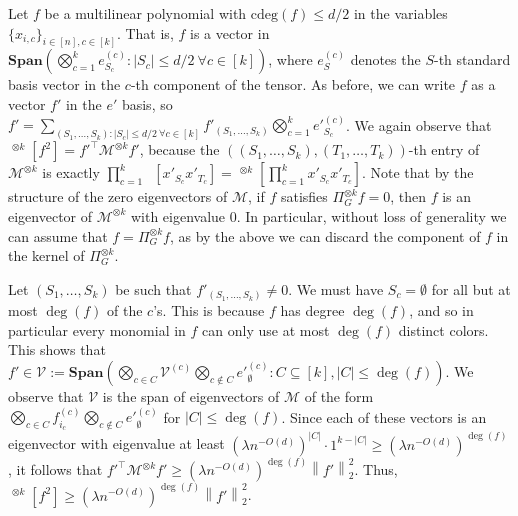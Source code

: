 \documentclass[10pt,a4paper]{article}
\theoremstyle{definition}
\newcommand{\cV}{\mathcal V}
\DeclareMathOperator{\pE}{\tilde{\mathbb{E}}}
\def\Span#1{\textbf{Span}\left(#1  \right)}
\def\abs#1{\left|#1  \right|}
\def\norm#1{\left\| #1 \right\|}
\newcommand{\M}{\mathcal{M}}
\newcommand{\cdeg}{\mathrm{cdeg}}
\newcommand{\numcolors}{k}
\begin{document}
Let $f$ be a multilinear polynomial with $\cdeg(f) \leq d/2$ in the variables $\{x_{i,c}\}_{i \in [n], c \in [\numcolors]}$. That is, $f$ is a vector in $\Span{ \bigotimes_{c =1}^{\numcolors} e^{(c)}_{S_c} : \abs{S_c} \leq d/2 \ \forall c \in [\numcolors]}$, where $e^{(c)}_S$ denotes the $S$-th standard basis vector in the $c$-th component of the tensor. As before, we can write $f$ as a vector $f'$ in the $e'$ basis, so $f' = \sum_{(S_1, \dots, S_\numcolors) : \abs{S_c} \leq d/2 \ \forall c \in [\numcolors]} f'_{(S_1, \dots, S_\numcolors)} \bigotimes_{c = 1}^\numcolors e'^{(c)}_{S_c}$. We again observe that $\pE^{\otimes \numcolors}[f^2] = f'^{\top} \M^{\otimes \numcolors} f'$, because the $((S_1, \dots, S_\numcolors),(T_1 ,\dots, T_\numcolors))$-th entry of $\M^{\otimes \numcolors}$ is exactly $\prod_{c = 1}^\numcolors \pE[x'_{S_c} x'_{T_c}] = \pE^{\otimes \numcolors}[\prod_{c = 1}^\numcolors x'_{S_c} x'_{T_c}]$.  Note that by the structure of the zero eigenvectors of $\M$, if $f$ satisfies $\Pi_G^{\otimes \numcolors} f = 0$, then $f$ is an eigenvector of $\M^{\otimes \numcolors}$ with eigenvalue $0$. In particular, without loss of generality we can assume that $f = \Pi_G^{\otimes \numcolors} f$, as by the above we can discard the component of $f$ in the kernel of $\Pi_G^{\otimes \numcolors}$.

Let $(S_1, \dots, S_\numcolors)$ be such that $f'_{(S_1, \dots, S_\numcolors)} \ne 0$. We must have $S_c = \emptyset$ for all but at most $\deg(f)$ of the $c$'s. This is because $f$ has degree $\deg(f)$, and so in particular every monomial in $f$ can only use at most $\deg(f)$ distinct colors. This shows that $f' \in \cV := \Span{ \bigotimes_{c \in C} \cV^{(c)} \bigotimes_{c \notin C} e'^{(c)}_{\emptyset} : C \subseteq [\numcolors], \abs{C} \leq \deg(f)}$. We observe that $\cV$ is the span of eigenvectors of $\M$ of the form $\bigotimes_{c \in C} f_{i_c}^{(c)} \bigotimes_{c \notin C} e'^{(c)}_{\emptyset}$ for $\abs{C} \leq \deg(f)$. Since each of these vectors is an eigenvector with eigenvalue at least $(\lambda n^{-O(d)})^{\abs{C}} \cdot 1^{\numcolors - \abs{C}} \geq (\lambda n^{-O(d)})^{\deg(f)}$, it follows that $f'^{\top} \M^{\otimes \numcolors} f' \geq (\lambda n^{-O(d)})^{\deg(f)}\norm{f'}_2^2$. Thus, $\pE^{\otimes k}[f^2] \geq (\lambda n^{-O(d)})^{\deg(f)}\norm{f'}_2^2$.
\end{document}
